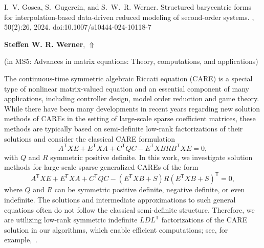 \documentclass[ILAS2025-program.tex]{subfiles}
\begin{document}
\begin{ilasabstract}
\begin{bibunit}
\begin{thebibliography}{10}
  I.~V. Gosea, S.~Gugercin, and S.~W.~R. Werner.
  \newblock Structured barycentric forms for interpolation-based data-driven
    reduced modeling of second-order systems.
  , 50(2):26, 2024.
  \newblock doi:10.1007/s10444-024-10118-7
\end{thebibliography}

        \end{bibunit}
        \end{ilasabstract}
     \hypertarget{down0363}{}\begin{ilasabstract}
    
    \textbf{Steffen W. R. Werner},  \hfill \hyperlink{up0363}{$\Uparrow$}
    
    (in {\color{mstitle}MS5: Advances in matrix equations: Theory, computations, and applications})
        
        \mtskip
    \begin{bibunit}
        The continuous-time symmetric algebraic Riccati equation (CARE) is a special
type of nonlinear matrix-valued equation and an essential component
of many applications, including controller design, model order reduction and
game theory.
While there have been many developments in recent years regarding new solution
methods of CAREs in the setting of large-scale sparse coefficient matrices,
these methods are typically based on semi-definite low-rank factorizations of
their solutions and consider the classical CARE formulation
\begin{equation*}
  A^{\mathsf{T}} X E + E^{\mathsf{T}} X A + C^{\mathsf{T}} Q C -
    E^{\mathsf{T}} X B R B^{\mathsf{T}} X E = 0,
\end{equation*}
with $Q$ and $R$ symmetric positive definite.
In this work, we investigate solution methods for large-scale sparse generalized
CAREs of the form
\begin{equation*}
  A^{\mathsf{T}} X E + E^{\mathsf{T}} X A + C^{\mathsf{T}} Q C -
    (E^{\mathsf{T}} X B + S) R (E^{\mathsf{T}} X B + S)^{\mathsf{T}} = 0,
\end{equation*}
where $Q$ and $R$ can be symmetric positive definite,  negative definite,
or even indefinite.
The solutions and intermediate approximations to such general equations often
do not follow the classical semi-definite structure.
Therefore, we are utilizing low-rank symmetric indefinite $LDL^{\mathsf{T}}$
factorizations of the CARE solution in our algorithms, which enable efficient
computations; see, for example,~\cite{Werner_SaaW24}.


\end{bibunit}
\end{ilasabstract}
\end{document}
